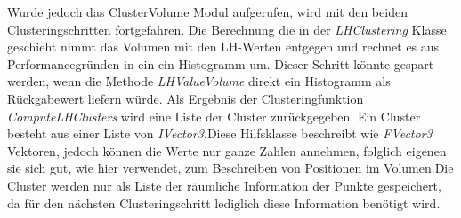 Wurde jedoch das ClusterVolume Modul aufgerufen, wird mit den beiden Clusteringschritten fortgefahren.
Die Berechnung die in der \textit{LHClustering} Klasse geschieht nimmt das Volumen mit den LH-Werten entgegen und rechnet es aus Performancegründen in ein ein Histogramm um. Dieser Schritt könnte gespart werden, wenn die Methode \textit{LHValueVolume} direkt ein Histogramm als Rückgabewert liefern würde. Als Ergebnis der Clusteringfunktion \textit{ComputeLHClusters} wird eine Liste der Cluster zurückgegeben. Ein Cluster besteht aus einer Liste von \textit{IVector3}.Diese Hilfsklasse beschreibt wie \textit{FVector3} Vektoren, jedoch können die Werte nur ganze Zahlen annehmen, folglich eigenen sie sich gut, wie hier verwendet, zum Beschreiben von Positionen im Volumen.Die Cluster werden nur als Liste der räumliche Information der Punkte gespeichert, da für den nächsten Clusteringschritt  lediglich diese Information benötigt wird. 